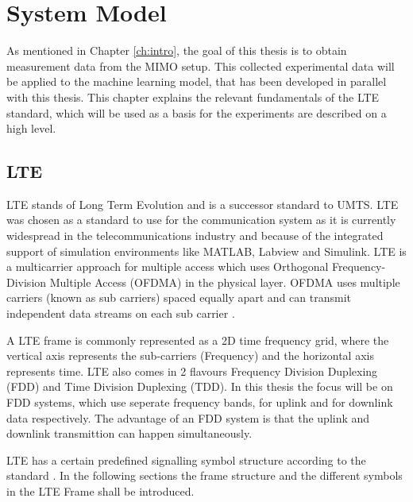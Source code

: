 \chapter{System Model}\label{ch:sysmodel}

As mentioned in Chapter \ref{ch:intro}, the goal of this thesis is to obtain measurement data from the MIMO setup. This collected experimental data will be applied to the machine learning model, that has been developed in parallel with this thesis. This chapter explains the relevant fundamentals of the LTE standard, which will be used as a basis for the experiments are described on a high level.

%

\section{LTE}\label{sec:LTEProc}

LTE stands of Long Term Evolution and is a successor standard to UMTS. LTE was chosen as a standard to use for the communication system as it is currently widespread in the telecommunications industry and because of the integrated support of simulation environments like MATLAB, Labview and Simulink. LTE is a multicarrier approach for multiple access which uses Orthogonal Frequency-Division Multiple Access (OFDMA) in the physical layer. OFDMA uses multiple carriers (known as sub carriers) spaced equally apart and can transmit independent data streams on each sub carrier \cite{rohling}.

A LTE frame is commonly represented as a 2D time frequency grid, where the vertical axis represents the sub-carriers (Frequency) and the horizontal axis represents time. LTE also comes in 2 flavours Frequency Division Duplexing (FDD) and Time Division Duplexing (TDD). In this thesis the focus will be on FDD systems, which use seperate frequency bands, for uplink and for downlink data respectively. The advantage of an FDD system is that the uplink and downlink transmittion can happen simultaneously.

LTE has a certain predefined signalling symbol structure according to the standard \cite{3gpp36211}. In the following sections the frame structure and the different symbols in the LTE Frame shall be introduced.

